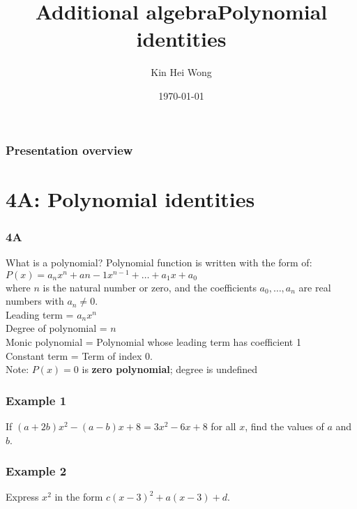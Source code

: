 \documentclass{beamer}
\title{Additional algebra}
\author{Kin Hei Wong}
\date{\today}
\begin{document}
\begin{frame}
    \titlepage
\end{frame}

\begin{frame}
    \frametitle{Presentation overview}
    \tableofcontents
\end{frame}

\section{4A: Polynomial identities}
\begin{frame}
    \frametitle{4A}
    \begin{center}
        \title{Polynomial identities}
        \maketitle
    \end{center}
\end{frame}

\begin{frame}{What is a polynomial?}
    Polynomial function is written with the form of:\\
    $P(x) = a_nx^n + a{n-1}x^{n-1} + \dots + a_1x + a_0$\\
    where $n$ is the natural number or zero, and the coefficients $a_0, \dots, a_n$ are real numbers with $a_n \neq 0$.\\
    Leading term = $a_nx^n$\\
    Degree of polynomial = $n$\\
    Monic polynomial = Polynomial whose leading term has coefficient 1\\
    Constant term = Term of index 0.\\
    Note: $P(x) = 0$ is \textbf{zero polynomial}; degree is undefined
\end{frame}

\begin{frame}[t]
    \frametitle{Example 1}
    If $(a + 2b)x^2  - (a - b)x + 8 = 3x^2 - 6x + 8$ for all $x$, find the values of $a$ and $b$.
\end{frame}

\begin{frame}[t]
    \frametitle{Example 2}
    Express $x^2$ in the form $c(x-3)^2 + a(x-3) + d$.
\end{frame}
\end{document}
